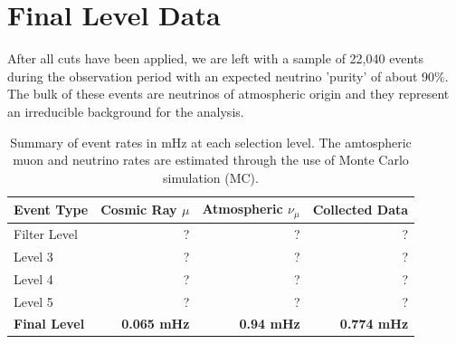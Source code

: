 \documentclass{gatech-thesis}
\begin{document}
\section{Final Level Data}
After all cuts have been applied, we are left with a sample of 22,040 events during the observation period with an expected neutrino 'purity' of about 90$\%$. The bulk of these events are neutrinos of atmospheric origin and they represent an irreducible background for the analysis.
\begin{table}[h]
\caption[Final level data rate.]{Summary of event rates in mHz at each selection level. The amtospheric muon and neutrino rates are estimated through the use of Monte Carlo simulation (MC).\label{tab:event_rates}}
\begin{center}
\begin{tabular}{|l|r|r|r|}
  \hline
 \textbf{Event Type} &\textbf{ Cosmic Ray $\mu$} &\textbf{ Atmospheric $\nu_{\mu}$} &\textbf{ Collected Data}\\
\hline
Filter Level & ? & ? & ? \\ \hline
Level 3 & ? & ? & ? \\ \hline
Level 4 & ? & ? & ? \\ \hline
Level 5 & ? & ? & ? \\ \hline
\textbf{Final Level}     & \textbf{0.065 mHz} & \textbf{0.94 mHz} & \textbf{0.774 mHz} \\ \hline
\end{tabular}
\end{center}
\end{table}

\end{document}
